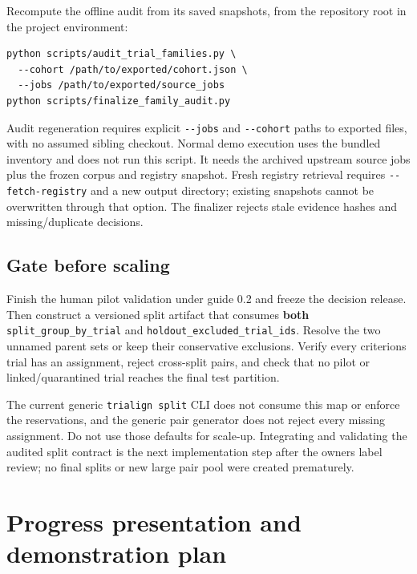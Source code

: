 \documentclass[10pt,letterpaper]{article}
\newcommand{\pathcode}[1]{\nolinkurl{#1}}
\begin{document}
Recompute the offline audit from its saved snapshots, from the repository root in the project environment:

\begin{Verbatim}[breaklines=true,fontsize=\small]
python scripts/audit_trial_families.py \
  --cohort /path/to/exported/cohort.json \
  --jobs /path/to/exported/source_jobs
python scripts/finalize_family_audit.py
\end{Verbatim}

Audit regeneration requires explicit \pathcode{--jobs} and \pathcode{--cohort} paths to exported files, with no assumed sibling checkout. Normal demo execution uses the bundled inventory and does not run this script. It needs the archived upstream source jobs plus the frozen corpus and registry snapshot. Fresh registry retrieval requires \pathcode{--fetch-registry} and a new output directory; existing snapshots cannot be overwritten through that option. The finalizer rejects stale evidence hashes and missing/duplicate decisions.

\subsection{Gate before scaling}\label{audit-gate-before-scaling}

Finish the human pilot validation under guide 0.2 and freeze the decision release. Then construct a versioned split artifact that consumes \textbf{both} \pathcode{split_group_by_trial} and \pathcode{holdout_excluded_trial_ids}. Resolve the two unnamed parent sets or keep their conservative exclusions. Verify every criterion\textquotesingle s trial has an assignment, reject cross-split pairs, and check that no pilot or linked/quarantined trial reaches the final test partition.

The current generic \pathcode{trialign split} CLI does not consume this map or enforce the reservations, and the generic pair generator does not reject every missing assignment. Do not use those defaults for scale-up. Integrating and validating the audited split contract is the next implementation step after the owner\textquotesingle s label review; no final splits or new large pair pool were created prematurely.

\clearpage
\section{Progress presentation and demonstration plan}\label{demo-progress-presentation-and-demonstration-plan}\label{sec:demoworkingnotes}
\end{document}

